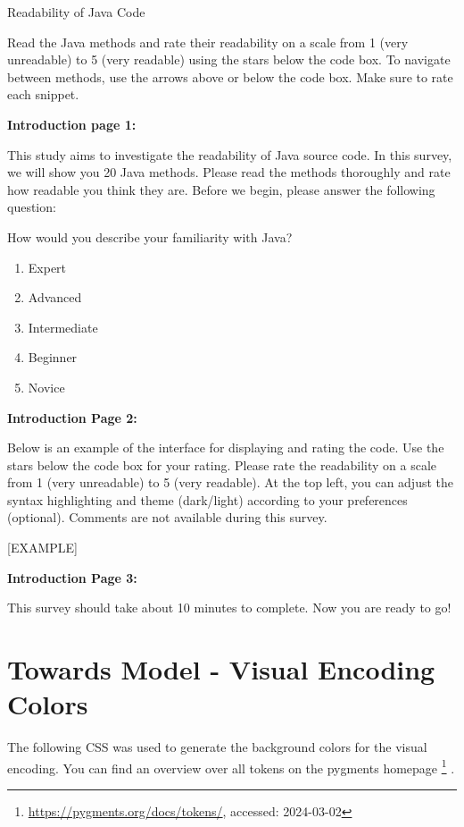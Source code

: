 \documentclass[%
class=scrreprt,
chapterprefix=false,%
open=right,%
twoside=true,%
paper=a4,%
logofile={Logo\_zentral\_farbig\_EN.png},%
thesistype=master,%
UKenglish,%
]{se2thesis}
\newcounter{urlfootnote}
\newcommand{\onecurl}[2]{%
	\stepcounter{urlfootnote}%
	\expandafter\def\csname urlfootnote:#1\endcsname{\theurlfootnote}%
	\footnote{\label{url:#1}\url{#1}, accessed: #2}%
}
\newcommand{\curl}[2]{%
		\onecurl{#1}{#2}%
}
\theoremstyle{definition}
\begin{document}
	Readability of Java Code
	
	Read the Java methods and rate their readability on a scale from 1 (very unreadable) to 5 (very readable) using the stars below the code box. To navigate between methods, use the arrows above or below the code box. Make sure to rate each snippet.
	
	\textbf{Introduction page 1:}
	
	This study aims to investigate the readability of Java source code. In this survey, we will show you 20 Java methods. Please read the methods thoroughly and rate how readable you think they are. Before we begin, please answer the following question:
	
	How would you describe your familiarity with Java?
	\begin{enumerate}
		\item Expert
		\item Advanced
		\item Intermediate
		\item Beginner
		\item Novice
	\end{enumerate}
	
	\pagebreak
	
	\textbf{Introduction Page 2:}
	
	Below is an example of the interface for displaying and rating the code. Use the stars below the code box for your rating. Please rate the readability on a scale from 1 (very unreadable) to 5 (very readable). At the top left, you can adjust the syntax highlighting and theme (dark/light) according to your preferences (optional). Comments are not available during this survey.
	
	[EXAMPLE]
	
	\textbf{Introduction Page 3:}
	
	This survey should take about 10 minutes to complete. Now you are ready to go! 


\chapter{Towards Model - Visual Encoding Colors}\label{appendix:model-visual-colors}	
	The following CSS was used to generate the background colors for the visual encoding. 
	You can find an overview over all tokens on the pygments homepage\curl{https://pygments.org/docs/tokens/}{2024-03-02}.
\end{document}
